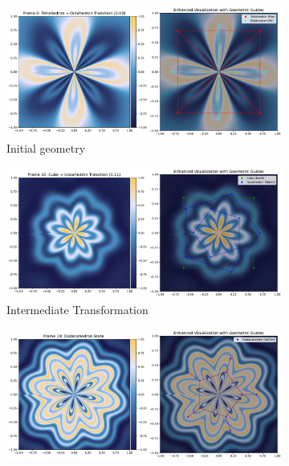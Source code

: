 \documentclass[12pt,letterpaper]{article}
\begin{document}
\begin{figure}[H]
    \centering
    \begin{subfigure}[b]{0.32\textwidth}
        \includegraphics[width=\textwidth]{figures_enhanced_20250503_161506/geometric_transformation_enhanced_0.pdf}
        \caption{Initial geometry}
        \label{fig:computation_a}
    \end{subfigure}
    \hfill
    \begin{subfigure}[b]{0.32\textwidth}
        \includegraphics[width=\textwidth]{figures_enhanced_20250503_161506/geometric_transformation_enhanced_10.pdf}
        \caption{Intermediate Transformation}
        \label{fig:computation_b}
    \end{subfigure}
    \hfill
    \begin{subfigure}[b]{0.32\textwidth}
        \includegraphics[width=\textwidth]{figures_enhanced_20250503_161506/geometric_transformation_enhanced_19.pdf}

\end{subfigure}
\end{figure}
\end{document}
